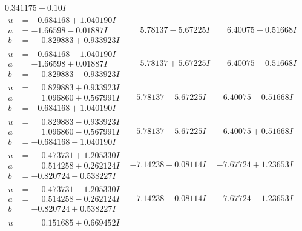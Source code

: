\documentclass[1p]{elsarticle_modified}
\theoremstyle{definition}
\begin{document}
$$\begin{array}{c|c|c}
0.341175 + 0. 10   I\phantom{ +0.000000I} \\ \hline\begin{aligned}
u &= -0.684168 + 1.040190 I \\
a &= -1.66598 - 0.01887 I \\
b &= \phantom{-}0.829883 + 0.933923 I\end{aligned}
 & \phantom{-}5.78137 - 5.67225 I & \phantom{-}6.40075 + 0.51668 I \\ \hline\begin{aligned}
u &= -0.684168 - 1.040190 I \\
a &= -1.66598 + 0.01887 I \\
b &= \phantom{-}0.829883 - 0.933923 I\end{aligned}
 & \phantom{-}5.78137 + 5.67225 I & \phantom{-}6.40075 - 0.51668 I \\ \hline\begin{aligned}
u &= \phantom{-}0.829883 + 0.933923 I \\
a &= \phantom{-}1.096860 + 0.567991 I \\
b &= -0.684168 + 1.040190 I\end{aligned}
 & -5.78137 + 5.67225 I & -6.40075 - 0.51668 I \\ \hline\begin{aligned}
u &= \phantom{-}0.829883 - 0.933923 I \\
a &= \phantom{-}1.096860 - 0.567991 I \\
b &= -0.684168 - 1.040190 I\end{aligned}
 & -5.78137 - 5.67225 I & -6.40075 + 0.51668 I \\ \hline\begin{aligned}
u &= \phantom{-}0.473731 + 1.205330 I \\
a &= \phantom{-}0.514258 + 0.262124 I \\
b &= -0.820724 - 0.538227 I\end{aligned}
 & -7.14238 + 0.08114 I & -7.67724 + 1.23653 I \\ \hline\begin{aligned}
u &= \phantom{-}0.473731 - 1.205330 I \\
a &= \phantom{-}0.514258 - 0.262124 I \\
b &= -0.820724 + 0.538227 I\end{aligned}
 & -7.14238 - 0.08114 I & -7.67724 - 1.23653 I \\ \hline\begin{aligned}
u &= \phantom{-}0.151685 + 0.669452 I \\

\end{aligned}
\end{array}$$
\end{document}
